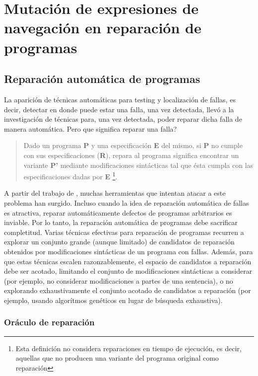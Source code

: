 \chapter{Mutaci\'on de expresiones de navegaci\'on en reparaci\'on de programas}
\label{cap:repair}

\section{Reparaci\'on autom\'atica de programas}
\label{sec:repair}

La aparici\'on de t\'ecnicas autom\'aticas para testing y localizaci\'on de fallas, es decir, detectar en donde puede estar una falla, una vez detectada, llev\'o a la investigaci\'on de t\'ecnicas para, una vez detectada, poder reparar dicha falla de manera autom\'atica. Pero que significa reparar una falla?
\begin{quote}
	Dado un programa \textbf{P} y una especificaci\'on \textbf{E} del mismo, si \textbf{P} no cumple con sus especificaciones (\textbf{R}), repara al programa significa encontrar un variante \textbf{P'} mediante modificaciones sint\'acticas tal que \'esta cumpla con las especificaciones dadas por \textbf{E} \footnote{Esta definici\'on no considera reparaciones en tiempo de ejecuci\'on, es decir, aquellas que no producen una variante del programa original como reparaci\'on}.
\end{quote}
A partir del trabajo de \cite{bibliography.repair.ArcuriY08}, muchas herramientas que intentan atacar a este problema han surgido. Incluso cuando la idea de reparaci\'on autom\'atica de fallas es atractiva, reparar autom\'aticamente defectos de programas arbitrarios es inviable. Por lo tanto, la reparaci\'on autom\'atica de programas debe sacrificar completitud. Varias t\'ecnicas efectivas para reparaci\'on de programas recurren a explorar un conjunto grande (aunque limitado) de candidatos de reparaci\'on obtenidos por modificaciones sint\'acticas de un programa con fallas. Adem\'as, para que estas t\'ecnicas escalen razonzablemente, el espacio de candidatos a reparaci\'on debe ser acotado, limitando el conjunto de modificaciones sint\'acticas a considerar (por ejemplo, no considerar modificaciones a partes de una sentencia), o no explorando exhaustivamente el conjunto acotado de candidatos a reparaci\'on (por ejemplo, usando algor\'itmos gen\'eticos en lugar de b\'usqueda exhaustiva).

\subsection{Or\'aculo de reparaci\'on}
\label{sec:repair.specs}

